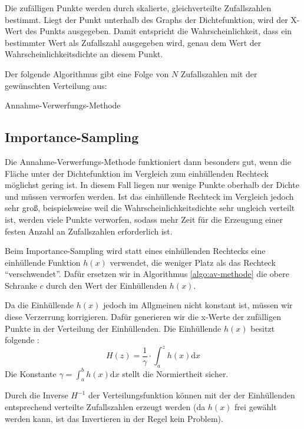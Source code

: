 Die zufälligen Punkte werden durch skalierte, gleichverteilte Zufallszahlen
bestimmt. Liegt der Punkt unterhalb des Graphs der Dichtefunktion, wird der
X-Wert des Punkts ausgegeben. Damit entspricht die Wahrscheinlichkeit, dass ein
bestimmter Wert als Zufallszahl ausgegeben wird, genau dem Wert der
Wahrscheinlichkeitsdichte an diesem Punkt.

Der folgende Algorithmus gibt eine Folge von $N$ Zufallszahlen mit der gewünschten
Verteilung aus:

\begin{algorithm}[h!]


\caption{Annahme-Verwerfungs-Methode}\label{algo:av-methode}
\end{algorithm}

\subsection{Importance-Sampling}
\label{algo:imp-samp}

Die Annahme-Verwerfungs-Methode funktioniert dann besonders gut, wenn die Fläche
unter der Dichtefunktion im Vergleich zum einhüllenden Rechteck möglichst gering
ist. In diesem Fall liegen nur wenige Punkte oberhalb der Dichte und müssen
verworfen werden. Ist das einhüllende Rechteck im Vergleich jedoch sehr groß,
beispielsweise weil die Wahrscheinlichkeitsdichte sehr ungleich verteilt ist,
werden viele Punkte verworfen, sodass mehr Zeit für die Erzeugung einer festen
Anzahl an Zufallszahlen erforderlich ist.

Beim Importance-Sampling wird statt eines einhüllenden Rechtecks eine einhüllende
Funktion $h(x)$ verwendet, die weniger Platz als das Rechteck "`verschwendet"'.
Dafür ersetzen wir in Algorithmus \ref{algo:av-methode} die obere Schranke $c$
durch den Wert der Einhüllenden $h(x)$.

Da die Einhüllende $h(x)$ jedoch im Allgmeinen nicht konstant ist, müssen wir
diese Verzerrung korrigieren. Dafür generieren wir die x-Werte der zufälligen
Punkte in der Verteilung der Einhüllenden. Die Einhüllende $h(x)$ besitzt
folgende :
\[H(z) = \frac{1}{\gamma}\cdot\int_a^z h(x) \mathrm{d}x\]
Die Konstante $\gamma = \int_a^b h(x)\mathrm{d}x$ stellt die Normiertheit sicher.

Durch die Inverse $H^{-1}$ der Verteilungsfunktion können mit der
 der Einhüllenden entsprechend
verteilte Zufallszahlen erzeugt werden (da $h(x)$ frei gewählt werden kann, ist
das Invertieren in der Regel kein Problem).

